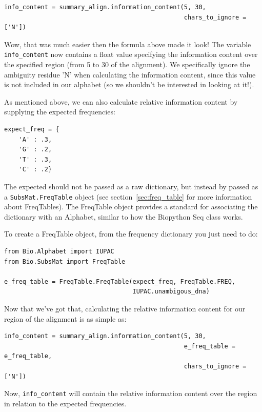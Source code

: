 \documentclass{report}
\begin{document}
\begin{verbatim}
info_content = summary_align.information_content(5, 30, 
                                                 chars_to_ignore = ['N'])
\end{verbatim}

Wow, that was much easier then the formula above made it look! The variable \verb|info_content| now contains a float value specifying the information content over the specified region (from 5 to 30 of the alignment). We specifically ignore the ambiguity residue 'N' when calculating the information content, since this value is not included in our alphabet (so we shouldn't be interested in looking at it!).


As mentioned above, we can also calculate relative information content by supplying the expected frequencies:

\begin{verbatim}
expect_freq = {
    'A' : .3,
    'G' : .2,
    'T' : .3,
    'C' : .2}
\end{verbatim}

The expected should not be passed as a raw dictionary, but instead by passed as a \verb|SubsMat.FreqTable| object (see section~\ref{sec:freq_table} for more information about FreqTables). The FreqTable object provides a standard for associating the dictionary with an Alphabet, similar to how the Biopython Seq class works. 


To create a FreqTable object, from the frequency dictionary you just need to do:

\begin{verbatim}
from Bio.Alphabet import IUPAC
from Bio.SubsMat import FreqTable

e_freq_table = FreqTable.FreqTable(expect_freq, FreqTable.FREQ,
                                   IUPAC.unambigous_dna)
\end{verbatim}

Now that we've got that, calculating the relative information content for our region of the alignment is as simple as:


\begin{verbatim}
info_content = summary_align.information_content(5, 30,
                                                 e_freq_table = e_freq_table,
                                                 chars_to_ignore = ['N'])
\end{verbatim}

Now, \verb|info_content| will contain the relative information content over the region in relation to the expected frequencies.
\end{document}
